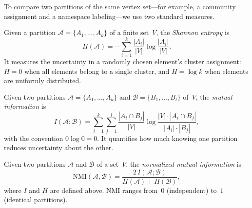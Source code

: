 To compare two partitions of the same vertex set---for example, a community assignment and a namespace labeling---we use two standard measures.

\begin{definition}
\label{def:shannon-entropy}
Given a partition $\mathcal{A} = \{A_1, \ldots, A_k\}$ of a finite set~$V$, the \emph{Shannon entropy} is
\[
  H(\mathcal{A}) = -\sum_{i=1}^{k} \frac{|A_i|}{|V|} \log \frac{|A_i|}{|V|}.
\]
It measures the uncertainty in a randomly chosen element's cluster assignment: $H = 0$ when all elements belong to a single cluster, and $H = \log k$ when elements are uniformly distributed.
\end{definition}

\begin{definition}
\label{def:mutual-information}
Given two partitions $\mathcal{A} = \{A_1, \ldots, A_k\}$ and $\mathcal{B} = \{B_1, \ldots, B_l\}$ of~$V$, the \emph{mutual information} is
\[
  I(\mathcal{A}; \mathcal{B}) = \sum_{i=1}^{k} \sum_{j=1}^{l} \frac{|A_i \cap B_j|}{|V|} \log \frac{|V| \cdot |A_i \cap B_j|}{|A_i| \cdot |B_j|},
\]
with the convention $0 \log 0 = 0$. It quantifies how much knowing one partition reduces uncertainty about the other.
\end{definition}

\begin{definition}
\label{def:nmi}
Given two partitions $\mathcal{A}$ and $\mathcal{B}$ of a set~$V$, the \emph{normalized mutual information} is
\[
  \mathrm{NMI}(\mathcal{A}, \mathcal{B}) = \frac{2\, I(\mathcal{A}; \mathcal{B})}{H(\mathcal{A}) + H(\mathcal{B})},
\]
where $I$ and $H$ are defined above. NMI ranges from~$0$ (independent) to~$1$ (identical partitions).
\end{definition}

